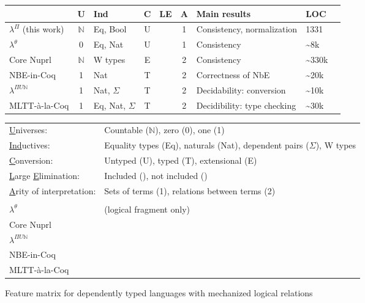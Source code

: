 \documentclass[\ifpublic nolinenum\else\fi,online,OA]{jfp}
\newcommand{\scw}[1]{}
\newcommand{\lang}{$\lambda^{\Pi}$\xspace}
\newcommand{\cmark}{\ding{51}}
\newcommand{\xmark}{\ding{55}}
\theoremstyle{definition}
\begin{document}
\begin{figure}
  \begin{tabular}{| l |  c  | l | c | c | c | l | l | r | }
    \hline
      & U & Ind & C & LE & A & Main results & LOC \\
    \hline
    \lang{} (this work) & $\mathbb{N}$ & Eq, Bool & U & \cmark & 1 
    & Consistency, normalization & 1331 \\
    $\lambda^\theta$ & 0 & Eq, Nat & U & \xmark & 1 & Consistency & \textasciitilde{}8k\\
    Core Nuprl & $\mathbb{N}$ & W types & E & \cmark & 2 & Consistency & \textasciitilde{}330k \\
    NBE-in-Coq & 1 & Nat & T & \xmark & 2 & Correctness of NbE & \textasciitilde{}20k \\
    $\lambda^{\Pi U\mathbb{N}}$ & 1 & Nat, $\Sigma$ & T & \cmark & 2 & Decidability: conversion & \textasciitilde{}10k \\
    MLTT-\`a-la-Coq & 1 & Eq, Nat, $\Sigma$ & T & \cmark & 2 & Decidibility: type checking & \textasciitilde{}30k \\
    \hline
  \end{tabular}

  \begin{tabular}{ll} \\
  \underline{U}niverses: & Countable ($\mathbb{N}$), zero (0), one (1) \\
  \underline{Ind}uctives: & Equality types (Eq), naturals (Nat), dependent pairs ($\Sigma$), W types \\
  \underline{C}onversion: & Untyped (U), typed (T),  extensional (E) \\
  \underline{L}arge \underline{E}limination: & Included (\cmark), not included (\xmark) \\
  \underline{A}rity of interpretation: & Sets of terms (1), relations between terms (2) \\
  \\
  $\lambda^\theta$  & \citet{casinghino:combining-proofs-programs} (logical fragment only) \\
  Core Nuprl &\citet{anand2014towards} \\
  $\lambda^{\Pi U\mathbb{N}}$ &\citet{decagda} \\
  NBE-in-Coq& \citet{nbeincoq} \\
  MLTT-\`a-la-Coq &\citet{martin-lof-a-la-coq} \\
  \end{tabular}

  \caption{Feature matrix for dependently typed languages with
    mechanized logical relations}
  \label{fig:featurematrix}
\end{figure}
\scw{Extra columns in Fig 10:  Predicate vs. Relational interpretation (we can explain this) / Typed vs. Untyped interpretation}
\end{document}
